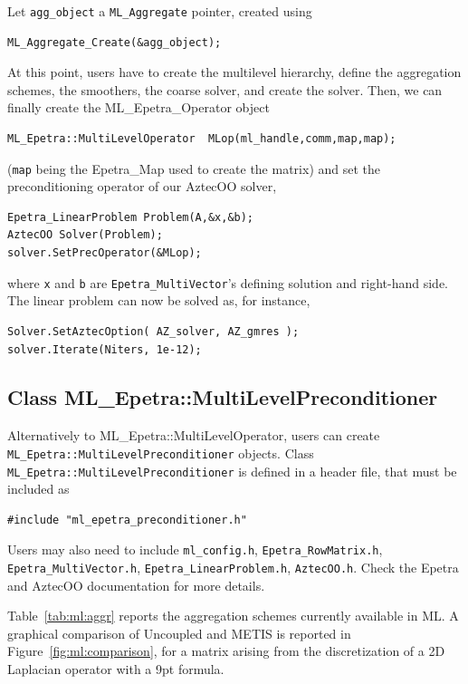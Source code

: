 Let \verb!agg_object! a \verb!ML_Aggregate! pointer, created using
\begin{verbatim}
ML_Aggregate_Create(&agg_object);
\end{verbatim}
At this point, users have to create the multilevel hierarchy, define the
aggregation schemes, the smoothers, the coarse solver, and create the solver.
Then, we can finally create the ML\_Epetra\_Operator object
\begin{verbatim}
ML_Epetra::MultiLevelOperator  MLop(ml_handle,comm,map,map);
\end{verbatim}
(\verb!map! being the Epetra\_Map used to create the matrix) and set the
preconditioning operator of our AztecOO solver,
\begin{verbatim}
Epetra_LinearProblem Problem(A,&x,&b);
AztecOO Solver(Problem);
solver.SetPrecOperator(&MLop);
\end{verbatim}
where \verb!x! and \verb!b! are \verb!Epetra_MultiVector!'s defining
solution and right-hand side. The linear problem can now be solved as,
for instance,
\begin{verbatim}
Solver.SetAztecOption( AZ_solver, AZ_gmres );
solver.Iterate(Niters, 1e-12);
\end{verbatim}


\subsection{Class ML\_Epetra::MultiLevelPreconditioner}
\label{sec:ml:preconditioner}

Alternatively to ML\_Epetra::MultiLevelOperator, users can create
\verb!ML_Epetra::MultiLevelPreconditioner!  objects.  Class
\verb!ML_Epetra::MultiLevelPreconditioner! is defined in a header file,
that must be included as
\begin{verbatim}
#include "ml_epetra_preconditioner.h" 
\end{verbatim}
Users may also need to include \verb!ml_config.h!,
\verb!Epetra_RowMatrix.h!, \verb!Epetra_MultiVector.h!,
\verb!Epetra_LinearProblem.h!,  \verb!AztecOO.h!. Check the Epetra and
AztecOO documentation for more details.

Table~\ref{tab:ml:aggr} reports the aggregation schemes currently
available in ML. A graphical comparison of Uncoupled and METIS is
reported in Figure~\ref{fig:ml:comparison}, for a matrix arising from
the discretization of a 2D Laplacian operator with a 9pt formula.

